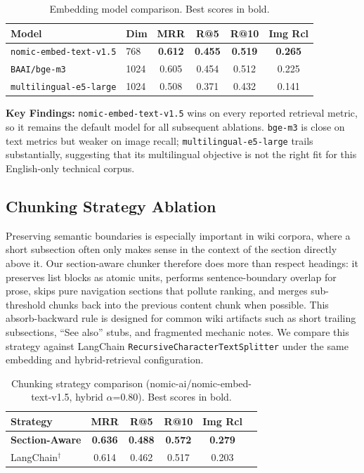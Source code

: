 \documentclass[11pt,a4paper]{article}
\begin{document}
\begin{table}[h]
\caption{Embedding model comparison. Best scores in bold.}
\label{tab:embedding}
\centering
\begin{tabular}{llcccc}
\toprule
\textbf{Model} & \textbf{Dim} & \textbf{MRR} & \textbf{R@5} & \textbf{R@10} & \textbf{Img Rcl} \\
\midrule
\texttt{nomic-embed-text-v1.5} & 768 & \textbf{0.612} & \textbf{0.455} & \textbf{0.519} & \textbf{0.265} \\
\texttt{BAAI/bge-m3} & 1024 & 0.605 & 0.454 & 0.512 & 0.225 \\
\texttt{multilingual-e5-large} & 1024 & 0.508 & 0.371 & 0.432 & 0.141 \\
\bottomrule
\end{tabular}

\end{table}

\textbf{Key Findings:} \texttt{nomic-embed-text-v1.5} wins on every reported retrieval metric, so it remains the default model for all subsequent ablations. \texttt{bge-m3} is close on text metrics but weaker on image recall; \texttt{multilingual-e5-large} trails substantially, suggesting that its multilingual objective is not the right fit for this English-only technical corpus.


\subsection{Chunking Strategy Ablation}
\label{sec:chunking-axis}

Preserving semantic boundaries is especially important in wiki corpora, where a short subsection often only makes sense in the context of the section directly above it. Our section-aware chunker therefore does more than respect headings: it preserves list blocks as atomic units, performs sentence-boundary overlap for prose, skips pure navigation sections that pollute ranking, and merges sub-threshold chunks back into the previous content chunk when possible. This absorb-backward rule is designed for common wiki artifacts such as short trailing subsections, ``See also'' stubs, and fragmented mechanic notes. We compare this strategy against LangChain \texttt{RecursiveCharacterTextSplitter} under the same embedding and hybrid-retrieval configuration.

\begin{table}[h]
\caption{Chunking strategy comparison (nomic-ai/nomic-embed-text-v1.5, hybrid $\alpha$=0.80). Best scores in bold.}
\label{tab:chunking}

\centering
\begin{tabular}{lccccc}
\toprule
\textbf{Strategy} & \textbf{MRR} & \textbf{R@5} & \textbf{R@10} & \textbf{Img Rcl} \\
\midrule
\textbf{Section-Aware} & \textbf{0.636} & \textbf{0.488} & \textbf{0.572} & \textbf{0.279} \\
LangChain$^\dagger$ & 0.614 & 0.462 & 0.517 & 0.203 \\
\bottomrule
\end{tabular}
\end{table}
\end{document}
